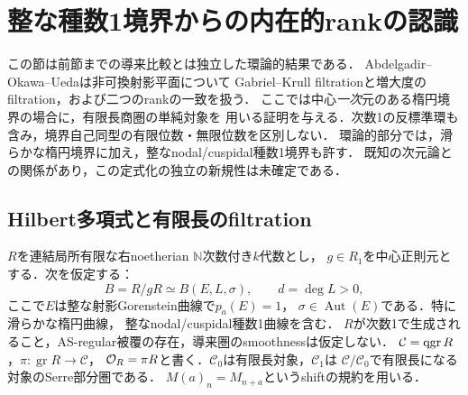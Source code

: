 \section{整な種数1境界からの内在的rankの認識}\label{sec:elliptic-rank}

この節は前節までの導来比較とは独立した環論的結果である．
Abdelgadir--Okawa--Ueda\cite[Appendix~A]{AOU}は非可換射影平面について
Gabriel--Krull filtrationと増大度のfiltration，および二つのrankの一致を扱う．
ここでは中心\emph{一次}元のある楕円境界の場合に，有限長商圏の単純対象を
用いる証明を与える．次数1の反標準環も含み，境界自己同型の有限位数・無限位数を区別しない．
環論的部分では，滑らかな楕円境界に加え，整なnodal/cuspidal種数1境界も許す．
既知の次元論との関係があり，この定式化の独立の新規性は未確定である．

\subsection{Hilbert多項式と有限長のfiltration}

$R$を連結局所有限な右noetherian $\mathbb N$次数付き$k$代数とし，
$g\in R_1$を中心正則元とする．次を仮定する：
\begin{equation}\label{eq:rank-boundary-assumption}
 B=R/gR\simeq B(E,L,\sigma),\qquad d=\deg L>0,
\end{equation}
ここで$E$は整な射影Gorenstein曲線で$p_a(E)=1$，
$\sigma\in\operatorname{Aut}(E)$である．特に滑らかな楕円曲線，
整なnodal/cuspidal種数1曲線を含む．
$R$が次数1で生成されること，AS-regular被覆の存在，導来圏のsmoothnessは仮定しない．
$\mathcal C=\operatorname{qgr} R$，$\pi:\operatorname{gr}R\to\mathcal C$，
$\mathcal O_R=\pi R$と書く．$\mathcal C_0$は有限長対象，$\mathcal C_1$は
$\mathcal C/\mathcal C_0$で有限長になる対象のSerre部分圏である．
$M(a)_n=M_{n+a}$というshiftの規約を用いる．

